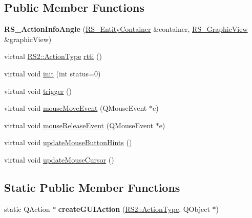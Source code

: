 \subsection*{Public Member Functions}
\begin{DoxyCompactItemize}
\item 
\hypertarget{classRS__ActionInfoAngle_a7f9cbb796619f8396c8534c1e4c7a368}{{\bfseries R\-S\-\_\-\-Action\-Info\-Angle} (\hyperlink{classRS__EntityContainer}{R\-S\-\_\-\-Entity\-Container} \&container, \hyperlink{classRS__GraphicView}{R\-S\-\_\-\-Graphic\-View} \&graphic\-View)}\label{classRS__ActionInfoAngle_a7f9cbb796619f8396c8534c1e4c7a368}

\item 
virtual \hyperlink{classRS2_afe3523e0bc41fd637b892321cfc4b9d7}{R\-S2\-::\-Action\-Type} \hyperlink{classRS__ActionInfoAngle_a9fcceeb049d1200a5ae7a51e4d1e779a}{rtti} ()
\item 
virtual void \hyperlink{classRS__ActionInfoAngle_affc08741baf9fdf33d2dac4d19709ec1}{init} (int status=0)
\item 
virtual void \hyperlink{classRS__ActionInfoAngle_ad75ebc8873ac8d7691f41f34b0374e5a}{trigger} ()
\item 
virtual void \hyperlink{classRS__ActionInfoAngle_ae3cb8dadc093f9653d72e05c7d5c99a6}{mouse\-Move\-Event} (Q\-Mouse\-Event $\ast$e)
\item 
virtual void \hyperlink{classRS__ActionInfoAngle_a610f8ba042b2fa0bad4e5b3aafb35530}{mouse\-Release\-Event} (Q\-Mouse\-Event $\ast$e)
\item 
virtual void \hyperlink{classRS__ActionInfoAngle_a1b7ff106fd7d1b7c6be9486bbcf7708b}{update\-Mouse\-Button\-Hints} ()
\item 
virtual void \hyperlink{classRS__ActionInfoAngle_a1e809b7ed8c8bfb9534781e212d0046f}{update\-Mouse\-Cursor} ()
\end{DoxyCompactItemize}
\subsection*{Static Public Member Functions}
\begin{DoxyCompactItemize}
\item 
\hypertarget{classRS__ActionInfoAngle_ac1f111e3b8680ebff3f271e4d4b306ba}{static Q\-Action $\ast$ {\bfseries create\-G\-U\-I\-Action} (\hyperlink{classRS2_afe3523e0bc41fd637b892321cfc4b9d7}{R\-S2\-::\-Action\-Type}, Q\-Object $\ast$)}\label{classRS__ActionInfoAngle_ac1f111e3b8680ebff3f271e4d4b306ba}

\end{DoxyCompactItemize}
